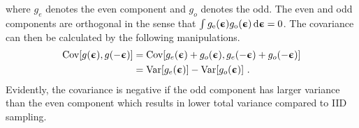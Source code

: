 where $g_e$ denotes the even component and $g_o$ denotes the odd. The even and odd components are orthogonal in the sense that $\int g_\text{e}({\boldsymbol{\upepsilon}})g_\text{o}({\boldsymbol{\upepsilon}})\,\text{d}{\boldsymbol{\upepsilon}} = 0$. The covariance can then be calculated by the following manipulations.
\begin{align}
    \text{Cov}{\left[g({\boldsymbol{\upepsilon}}),g(-{\boldsymbol{\upepsilon}})\right]}
    &= \text{Cov}{\left[g_e({\boldsymbol{\upepsilon}}) + g_o({\boldsymbol{\upepsilon}}),g_e(-{\boldsymbol{\upepsilon}}) + g_o(-{\boldsymbol{\upepsilon}})\right]}\nonumber\\
    &= \text{Var}{\left[g_e({\boldsymbol{\upepsilon}})\right]} - \text{Var}{\left[g_o({\boldsymbol{\upepsilon}})\right]} \ .
\end{align}
Evidently, the covariance is negative if the odd component has larger variance than the even component which results in lower total variance compared to \gls{IID} sampling.  
